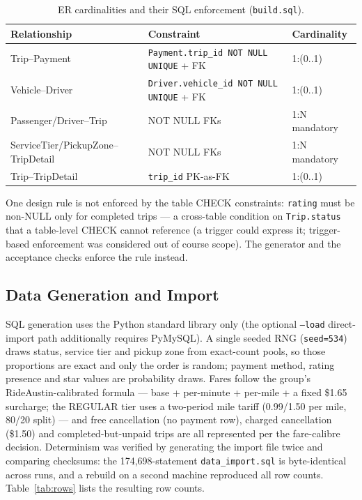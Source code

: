 \begin{table}[ht]
\centering
\caption{ER cardinalities and their SQL enforcement (\texttt{build.sql}).}
\label{tab:constraints}
\small
\begin{tabular}{@{}lp{7.2cm}l@{}}
\toprule
Relationship & Constraint & Cardinality \\
\midrule
Trip--Payment & \texttt{Payment.trip\_id NOT NULL UNIQUE} + FK & 1:(0..1) \\
Vehicle--Driver & \texttt{Driver.vehicle\_id NOT NULL UNIQUE} + FK & 1:(0..1) \\
Passenger/Driver--Trip & NOT NULL FKs & 1:N mandatory \\
ServiceTier/PickupZone--TripDetail & NOT NULL FKs & 1:N mandatory \\
Trip--TripDetail & \texttt{trip\_id} PK-as-FK & 1:(0..1) \\
\bottomrule
\end{tabular}
\end{table}

One design rule is not enforced by the table CHECK constraints: \texttt{rating} must be non-NULL only for completed
trips --- a cross-table condition on \texttt{Trip.status} that a table-level CHECK cannot reference (a trigger
could express it; trigger-based enforcement was considered out of course scope). The generator and the
acceptance checks enforce the rule instead.

\subsection{Data Generation and Import}
\label{sec:data}
SQL generation uses the Python standard library only (the optional \texttt{--load} direct-import path
additionally requires PyMySQL). A single seeded RNG (\texttt{seed=534}) draws status, service tier
and pickup zone from exact-count pools, so those proportions are exact and only the order is random;
payment method, rating presence and star values are probability draws. Fares follow the group's RideAustin-calibrated formula ---
base + per-minute + per-mile + a fixed \$1.65 surcharge; the REGULAR tier uses a two-period mile
tariff (0.99/1.50 per mile, 80/20 split) --- and free cancellation (no payment row), charged
cancellation (\$1.50) and completed-but-unpaid trips are all represented per the fare-calibre
decision. Determinism was verified by generating the import file twice and comparing checksums: the
174{,}698-statement \texttt{data\_import.sql} is byte-identical across runs, and a rebuild on a
second machine reproduced all row counts.
Table~\ref{tab:rows} lists the resulting row counts.


